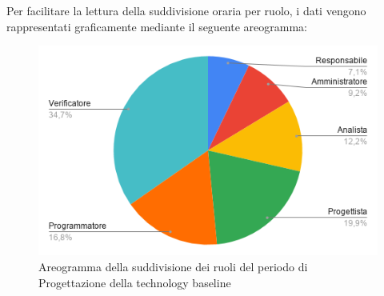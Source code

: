 \documentclass[../piano-di-progetto.tex]{subfiles}
\begin{document}
  Per facilitare la lettura della suddivisione oraria per ruolo, i dati vengono rappresentati graficamente mediante il seguente areogramma:
  \begin{figure}[H]
    \centering
    \includegraphics[width=12cm]{img/ruoli-progettazione.png}
    \caption{Areogramma della suddivisione dei ruoli del periodo di Progettazione della technology baseline}
    \label{fig:ore-ruolo-progettazione}
  \end{figure}
\end{document}
